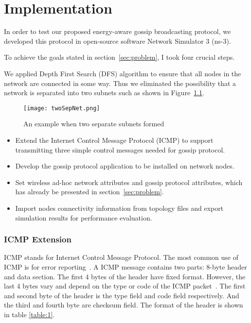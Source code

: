 \chapter{Implementation}
\label{Chapter4}

In order to test our proposed energy-aware gossip broadcasting protocol, we developed this protocol in open-source software Network Simulator 3 (ns-3). 

To achieve the goals stated in section~\ref{sec:problem}, I took four crucial steps.

We applied Depth First Search (DFS) algorithm to ensure that all nodes in the network are connected in some way. Thus we eliminated the possibility that a network is separated into two subnets such as shown in Figure~\ref{fig:twoSepNet}. 

\begin{figure}
	\centering
	\texttt{[image: twoSepNet.png]}
	\caption{An example when two separate subnets formed}
	\label{fig:twoSepNet}
\end{figure}


\begin{itemize}
	\item Extend the Internet Control Message Protocol (ICMP) to support transmitting three simple control messages needed for gossip protocol.
	\item Develop the gossip protocol application to be installed on network nodes.
	\item Set wireless ad-hoc network attributes and gossip protocol attributes, which has already be presented in section~\ref{sec:problem}.
	\item Import nodes connectivity information from topology files and export simulation results for performance evaluation.
\end{itemize}

\subsection{ICMP Extension}

ICMP stands for Internet Control Message Protocol. The most common use of ICMP is for error reporting~\cite{james}. A ICMP message contains two parts: 8-byte header and data section. The first 4 bytes of the header have fixed format. However, the last 4 bytes vary and depend on the type or code of the ICMP packet~\cite{forouzan}. The first and second byte of the header is the type field and code field respectively. And the third and fourth byte are checksum field. The format of the header is shown in table \ref{table:1}.

